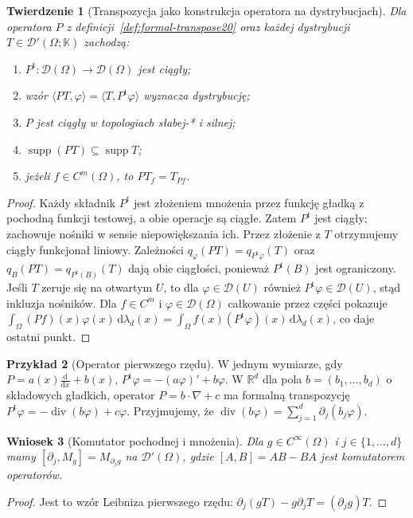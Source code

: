 \documentclass[11pt,a4paper]{article}
\numberwithin{equation}{section}
\theoremstyle{plain}
\newtheorem{twierdzenie}{Twierdzenie}[section]
\newtheorem{wniosek}[twierdzenie]{Wniosek}
\theoremstyle{definition}
\newtheorem{przyklad}[twierdzenie]{Przykład}
\theoremstyle{remark}
\newcommand{\R}{\mathbb R}
\newcommand{\K}{\mathbb K}
\DeclareMathOperator{\supp}{supp}
\begin{document}
\begin{twierdzenie}[Transpozycja jako konstrukcja operatora na dystrybucjach]
\label{thm:transpose20}
Dla operatora $P$ z definicji~\ref{def:formal-transpose20}
oraz każdej dystrybucji $T\in\mathcal D'(\Omega;\K)$
zachodzą:
\begin{enumerate}
\item $P^{\mathrm t}:\mathcal D(\Omega)\to\mathcal D(\Omega)$
jest ciągły;
\item wzór $\langle PT,\varphi\rangle=
\langle T,P^{\mathrm t}\varphi\rangle$ wyznacza dystrybucję;
\item $P$ jest ciągły w topologiach słabej-* i silnej;
\item $\supp(PT)\subseteq\supp T$;
\item jeżeli $f\in C^m(\Omega)$, to $PT_f=T_{Pf}$.
\end{enumerate}
\end{twierdzenie}
\begin{proof}
Każdy składnik $P^{\mathrm t}$ jest złożeniem mnożenia
przez funkcję gładką z pochodną funkcji testowej, a obie
operacje są ciągłe. Zatem $P^{\mathrm t}$ jest ciągły;
zachowuje nośniki w sensie niepowiększania ich.
Przez złożenie z $T$ otrzymujemy ciągły funkcjonał liniowy.
Zależności
$q_\varphi(PT)=q_{P^{\mathrm t}\varphi}(T)$ oraz
$q_B(PT)=q_{P^{\mathrm t}(B)}(T)$
dają obie ciągłości, ponieważ $P^{\mathrm t}(B)$ jest ograniczony.
Jeśli $T$ zeruje się na otwartym $U$, to dla
$\varphi\in\mathcal D(U)$ również
$P^{\mathrm t}\varphi\in\mathcal D(U)$, stąd inkluzja nośników.
Dla $f\in C^m$ i $\varphi\in\mathcal D(\Omega)$
całkowanie przez części pokazuje
$\int_\Omega(Pf)(x)\varphi(x)\,\mathrm d\lambda_d(x)
=\int_\Omega f(x)(P^{\mathrm t}\varphi)(x)\,\mathrm d\lambda_d(x)$,
co daje ostatni punkt.
\end{proof}

\begin{przyklad}[Operator pierwszego rzędu]
\label{ex:first-order-P20}
W jednym wymiarze, gdy $P=a(x)\frac{\mathrm d}{\mathrm dx}+b(x)$,
$P^{\mathrm t}\varphi=-(a\varphi)'+b\varphi$.
W $\R^d$ dla pola $b=(b_1,\ldots,b_d)$ o składowych
gładkich, operator $P=b\cdot\nabla+c$ ma formalną
transpozycję $P^{\mathrm t}\varphi=-\operatorname{div}(b\varphi)
+c\varphi$. Przyjmujemy, że
$\operatorname{div}(b\varphi)=\sum_{j=1}^d\partial_j(b_j\varphi)$.
\end{przyklad}

\begin{wniosek}[Komutator pochodnej i mnożenia]
\label{cor:commutator20}
Dla $g\in C^\infty(\Omega)$ i $j\in\{1,\ldots,d\}$ mamy
$[\partial_j,M_g]=M_{\partial_jg}$ na $\mathcal D'(\Omega)$,
gdzie $[A,B]=AB-BA$ jest komutatorem operatorów.
\end{wniosek}
\begin{proof}
Jest to wzór Leibniza pierwszego rzędu:
$\partial_j(gT)-g\partial_jT=(\partial_jg)T$.
\end{proof}
\end{document}
